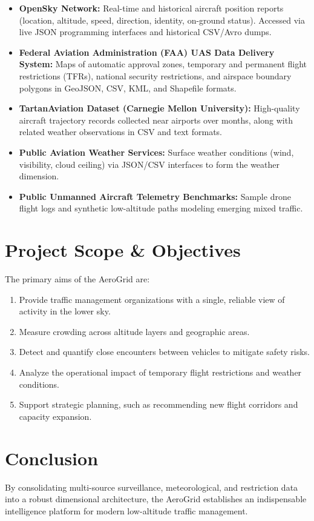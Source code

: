 \documentclass[11pt,a4paper]{article}
\begin{document}
\begin{itemize}
    \item \textbf{OpenSky Network:} Real-time and historical aircraft position reports (location, altitude, speed, direction, identity, on-ground status). Accessed via live JSON programming interfaces and historical CSV/Avro dumps.
    \item \textbf{Federal Aviation Administration (FAA) UAS Data Delivery System:} Maps of automatic approval zones, temporary and permanent flight restrictions (TFRs), national security restrictions, and airspace boundary polygons in GeoJSON, CSV, KML, and Shapefile formats.
    \item \textbf{TartanAviation Dataset (Carnegie Mellon University):} High-quality aircraft trajectory records collected near airports over months, along with related weather observations in CSV and text formats.
    \item \textbf{Public Aviation Weather Services:} Surface weather conditions (wind, visibility, cloud ceiling) via JSON/CSV interfaces to form the weather dimension.
    \item \textbf{Public Unmanned Aircraft Telemetry Benchmarks:} Sample drone flight logs and synthetic low-altitude paths modeling emerging mixed traffic.
\end{itemize}

\section{Project Scope \& Objectives}
The primary aims of the AeroGrid are:
\begin{enumerate}
    \item Provide traffic management organizations with a single, reliable view of activity in the lower sky.
    \item Measure crowding across altitude layers and geographic areas.
    \item Detect and quantify close encounters between vehicles to mitigate safety risks.
    \item Analyze the operational impact of temporary flight restrictions and weather conditions.
    \item Support strategic planning, such as recommending new flight corridors and capacity expansion.
\end{enumerate}

\section{Conclusion}
By consolidating multi-source surveillance, meteorological, and restriction data into a robust dimensional architecture, the AeroGrid establishes an indispensable intelligence platform for modern low-altitude traffic management.
\end{document}
